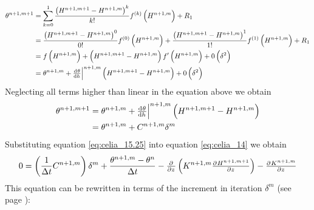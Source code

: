 \begin{align*}
  \theta^{n+1,m+1} &= \sum_{k=0}^1\frac{\del{ H^{n+1,m+1} - H^{n+1,m} }^k}{k!}f^{\del{ k }}\del{ H^{n+1,m} } + R_1 \\
                   &= \frac{\del{ H^{n+1,m+1} - H^{n+1,m} }^0}{0!} f^{\del{ 0 }}\del{ H^{n+1,m} } + \frac{\del{ H^{n+1,m+1} - H^{n+1,m} }^1}{1!} f^{\del{ 1 }}\del{ H^{n+1,m} } + R_1 \\
                   &= f\del{ H^{n+1,m} } + \del{ H^{n+1,m+1} - H^{n+1,m} } f'\del{ H^{n+1,m} } + 0 \del{ \delta^2 } \\
  \label{eq:celia_15}
                   &= \theta^{n+1,m} + \evalat{\od{\theta}{h}}{n+1,m} \del{ H^{n+1,m+1} - H^{n+1,m} } + 0 \del{ \delta^2 }
\end{align*}
Neglecting all terms higher than linear in the equation above we obtain
\begin{align}
  \theta^{n+1,m+1} &= \theta^{n+1,m} + \evalat{\od{\theta}{h}}{n+1,m} \del{ H^{n+1,m+1} - H^{n+1,m} } \\
  \label{eq:celia_15.25}
                   &= \theta^{n+1,m} + C^{n+1,m} \delta^m
\end{align}
Substituting equation \eqref{eq:celia_15.25} into equation \eqref{eq:celia_14} we obtain
\begin{equation*}
  0 = \del{\frac{1}{\Delta t} C^{n+1,m}} \delta^m + \frac{\theta^{n+1,m}  - \theta^n}{\Delta t} - \pd{}{z} \del{ K^{n+1,m}\pd{H^{n+1,m+1}}{z} } - \pd{K^{n+1,m}}{z}
\end{equation*}
This equation can be rewritten in terms of the increment in iteration $\delta ^m$ (see page \pageref{celia_15.5_transformation}):
\newpage
\label{celia_15.5_transformation}
